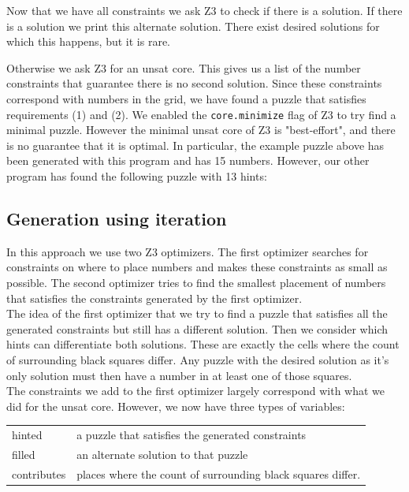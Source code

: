 \documentclass{scrartcl}
\begin{document}
	Now that we have all constraints we ask Z3 to check if there is a solution.
	If there is a solution we print this alternate solution.
	There exist desired solutions for which this happens, but it is rare.

	Otherwise we ask Z3 for an unsat core. This gives us a list of the number constraints that guarantee there is no second solution. Since these constraints correspond with numbers in the grid, we have found a puzzle that satisfies requirements (1) and (2). We enabled the \texttt{core.minimize} flag of Z3 to try find a minimal puzzle. However the minimal unsat core of Z3 is "best-effort", and there is no guarantee that it is optimal. In particular, the example puzzle above has been generated with this program and has 15 numbers. However, our other program has found the following puzzle with 13 hints:

	\begin{figure}[H]
		\centering
		
	\end{figure}

	\subsection{Generation using iteration} %
	\label{sub:mosaic_iteration}
	In this approach we use two Z3 optimizers.
	The first optimizer searches for constraints on where to place numbers and makes these constraints as small as possible.
	The second optimizer tries to find the smallest placement of numbers that satisfies the constraints generated by the first optimizer.\\

	The idea of the first optimizer that we try to find a puzzle that satisfies all the generated constraints but still has a different solution. Then we consider which hints can differentiate both solutions. These are exactly the cells where the count of surrounding black squares differ.
	Any puzzle with the desired solution as it's only solution must then have a number in at least one of those squares.\\

	The constraints we add to the first optimizer largely correspond with what we did for the unsat core. However, we now have three types of variables:

	\begin{tabular}{ll}
		hinted & a puzzle that satisfies the generated constraints\\
		filled & an alternate solution to that puzzle\\
		contributes & places where the count of surrounding black squares differ.
	\end{tabular}
\end{document}
